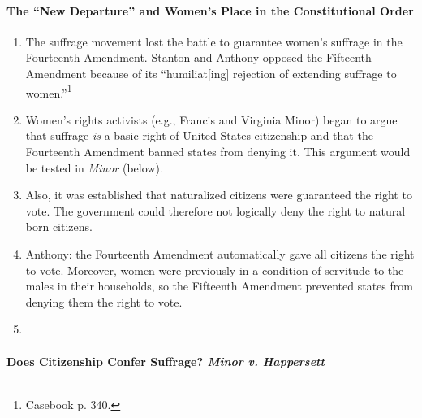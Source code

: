 \paragraph{The ``New Departure'' and Women's Place in the Constitutional 
Order}

\begin{enumerate}
    \item The suffrage movement lost the battle to guarantee women's suffrage 
    in the Fourteenth Amendment. Stanton and Anthony opposed the Fifteenth 
    Amendment because of its ``humiliat[ing] rejection of extending suffrage 
    to women.''\footnote{Casebook p. 340.}
    \item Women's rights activists (e.g., Francis and Virginia Minor) began to 
    argue that suffrage \emph{is} a basic right of United States citizenship 
    and that the Fourteenth Amendment banned states from denying it. This 
    argument would be tested in \emph{Minor} (below).
    \item Also, it was established that naturalized citizens were guaranteed 
    the right to vote. The government could therefore not logically deny the 
    right to natural born citizens.
    \item Anthony: the Fourteenth Amendment automatically gave all citizens 
    the right to vote. Moreover, women were previously in a condition of 
    servitude to the males in their households, so the Fifteenth Amendment 
    prevented states from denying them the right to vote.
    \item 
\end{enumerate}

\paragraph{Does Citizenship Confer Suffrage? \emph{Minor v. Happersett}}

